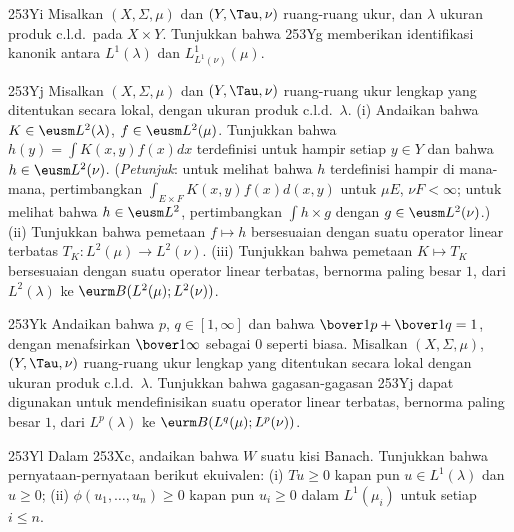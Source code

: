 {\spheader 253Yi Misalkan $(X,\Sigma,\mu)$ dan $(Y,\Tau,\nu)$ ruang-ruang
ukur, dan $\lambda$ ukuran produk c.l.d.\ pada $X\times Y$. Tunjukkan
bahwa 253Yg memberikan identifikasi kanonik antara $L^1(\lambda)$
dan $L^1_{L^1(\nu)}(\mu)$.

\spheader 253Yj Misalkan $(X,\Sigma,\mu)$ dan $(Y,\Tau,\nu)$ ruang-ruang
ukur lengkap yang ditentukan secara lokal, dengan ukuran produk c.l.d.\ $\lambda$.
(i) Andaikan bahwa $K\in\eusm L^2(\lambda)$,
$f\in\eusm L^2(\mu)$. Tunjukkan bahwa
$h(y)=\int K(x,y)f(x)dx$ terdefinisi untuk hampir setiap
$y\in Y$ dan bahwa $h\in\eusm L^2(\nu)$. ({\it Petunjuk\/}: untuk
melihat bahwa $h$ terdefinisi hampir di mana-mana, pertimbangkan
$\int_{E\times F}K(x,y)f(x)d(x,y)$
untuk $\mu E$, $\nu F<\infty$; untuk melihat bahwa
$h\in\eusm L^2$, pertimbangkan
$\int h\times g$ dengan $g\in\eusm L^2(\nu)$.) (ii) Tunjukkan bahwa
pemetaan $f\mapsto h$ bersesuaian dengan suatu operator linear terbatas
$T_K:L^2(\mu)\to L^2(\nu)$. (iii) Tunjukkan bahwa pemetaan $K\mapsto T_K$
bersesuaian dengan suatu operator linear terbatas, bernorma paling besar
$1$, dari $L^2(\lambda)$ ke $\eurm B(L^2(\mu);L^2(\nu))$.

\spheader 253Yk Andaikan bahwa $p$, $q\in[1,\infty]$ dan bahwa
$\bover1p+\bover1q=1$, dengan menafsirkan $\bover1{\infty}$ sebagai $0$
seperti biasa. Misalkan $(X,\Sigma,\mu)$, $(Y,\Tau,\nu)$ ruang-ruang ukur
lengkap yang ditentukan secara lokal dengan ukuran produk c.l.d.\ $\lambda$.
Tunjukkan bahwa gagasan-gagasan 253Yj dapat digunakan untuk mendefinisikan
suatu operator linear terbatas, bernorma paling besar $1$, dari
$L^p(\lambda)$ ke $\eurm B(L^q(\mu);L^p(\nu))$.

\spheader 253Yl Dalam 253Xc, andaikan bahwa $W$ suatu kisi Banach.
Tunjukkan bahwa pernyataan-pernyataan berikut ekuivalen: (i) $Tu\ge 0$
kapan pun $u\in L^1(\lambda)$ dan $u\ge0$; (ii)
$\phi(u_1,\ldots,u_n)\ge 0$ kapan pun
$u_i\ge 0$ dalam $L^1(\mu_i)$ untuk setiap $i\le n$.
}%

